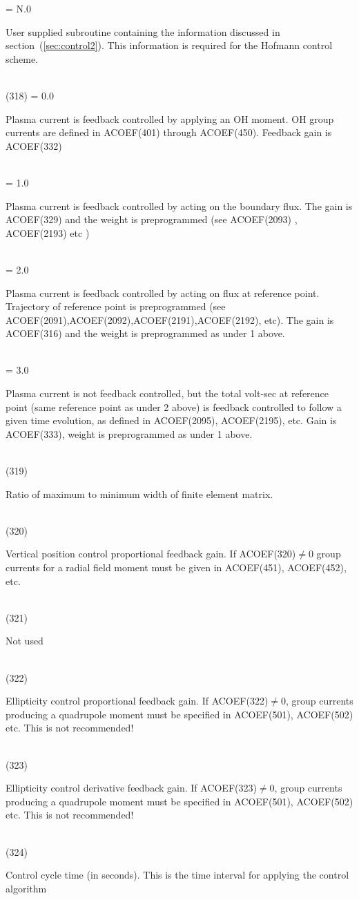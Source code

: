 \begin{tabbing}
      \> = N.0  \> \parbox[t]{\width}{User supplied subroutine containing the information
discussed in section~(\ref{sec:control2}).  This information is required for the Hofmann control
scheme.}\\
(318) \> = 0.0  \> \parbox[t]{\width}{Plasma current is feedback controlled by applying an OH
moment.  OH group currents are defined in ACOEF(401) through ACOEF(450).  Feedback gain
is ACOEF(332)}\\
      \> = 1.0  \> \parbox[t]{\width}{Plasma current is feedback controlled by acting on the
boundary flux.  The gain is ACOEF(329) and the weight is preprogrammed (see ACOEF(2093)
, ACOEF(2193) etc )}\\
      \> = 2.0  \> \parbox[t]{\width}{Plasma current is feedback controlled by acting on flux at
reference point.  Trajectory of reference point is preprogrammed (see
ACOEF(2091),ACOEF(2092),ACOEF(2191),ACOEF(2192), etc).  The gain is ACOEF(316) and
the weight is preprogrammed as under 1 above.}\\
      \> = 3.0  \> \parbox[t]{\width}{Plasma current is not feedback controlled, but the total
volt-sec at reference point (same reference point as under 2 above) is feedback controlled to
follow a given time evolution, as defined in ACOEF(2095), ACOEF(2195), etc.  Gain is
ACOEF(333), weight is preprogrammed as under 1 above.}\\
(319) \> \>\parbox[t]{\width}{ Ratio of maximum to minimum width of finite element matrix.}\\ 
(320) \> \> \parbox[t]{\width}{Vertical position control proportional feedback gain. If
ACOEF(320)$\ne$0 group currents for a radial field moment must be given in ACOEF(451),
ACOEF(452), etc.}\\
(321) \> \>\parbox[t]{\width}{Not used}\\
(322) \> \>\parbox[t]{\width}{Ellipticity \nolinebreak control proportional feedback gain.
\nolinebreak If ACOEF(322)$\ne$0, group currents producing a quadrupole moment must be
specified in ACOEF(501), ACOEF(502) etc.  This is not recommended!}\\
(323) \> \>\parbox[t]{\width}{Ellipticity control derivative feedback gain. If ACOEF(323)$\ne$0,
group currents producing a quadrupole moment must be specified in ACOEF(501), ACOEF(502)
etc.  This is not recommended!}\\
(324) \> \> \parbox[t]{\width}{Control cycle time (in seconds).  This is the time interval for
applying the control algorithm}\\

\end{tabbing}
